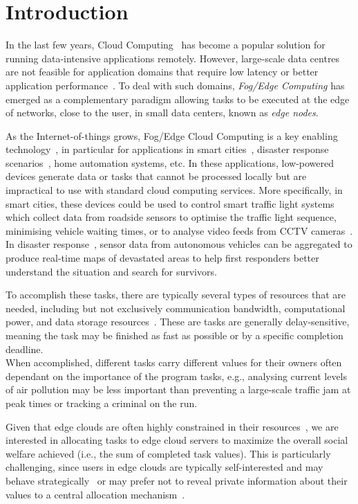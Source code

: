 \section{Introduction}
\label{sec:introduction}
In the last few years, Cloud Computing~\cite{cloud_cite} has become a popular solution for running data-intensive
applications remotely. However, large-scale data centres are not feasible for application domains that require low
latency or better application performance~\cite{mobile_edge_IoT}. To deal with such domains, \emph{Fog/Edge Computing}
has emerged as a complementary paradigm allowing tasks to be executed at the edge of networks, close to the user, in
small data centers, known as \emph{edge nodes}.

As the Internet-of-things grows, Fog/Edge Cloud Computing is a key enabling
technology~\cite{mobile_edge_IoT, edge_computing_iot}, in particular for applications
in smart cities~\cite{mobile_edge_smart}, disaster response scenarios~\cite{mobile_edge_disaster, smart_disaster_management},
home automation systems, etc. In these applications, low-powered devices generate data or tasks that cannot be
processed locally but are impractical to use with standard cloud computing services. More specifically, in smart cities,
these devices could be used to control smart traffic light systems~\cite{smart_cities_traffic_lights} which collect
data from roadside sensors to optimise the traffic light sequence, minimising vehicle waiting times, or to analyse
video feeds from CCTV cameras~\cite{Sreenu2019}. In disaster response~\cite{smart_disaster_management}, sensor data
from autonomous vehicles can be aggregated to produce real-time maps of devastated areas to help first responders better
understand the situation and search for survivors.

To accomplish these tasks, there are typically several types of resources that are needed, including but not exclusively
communication bandwidth, computational power, and data storage resources~\cite{vaji_infocom}. These are tasks are
generally delay-sensitive, meaning the task may be finished as fast as possible or by a specific completion deadline. \\
When accomplished, different tasks carry different values for their owners often dependant on the importance of the
program tasks, e.g., analysing current levels of air pollution may be less important than preventing a large-scale
traffic jam at peak times or tracking a criminal on the run.

Given that edge clouds are often highly constrained in their resources~\cite{edge_limitations}, we are interested in
allocating tasks to edge cloud servers to maximize the overall social welfare achieved (i.e., the sum of completed task
values). This is particularly challenging, since users in edge clouds are typically self-interested and may behave
strategically~\cite{Bi2019} or may prefer not to reveal private information about their values to a central allocation
mechanism~\cite{Pai2013}.

